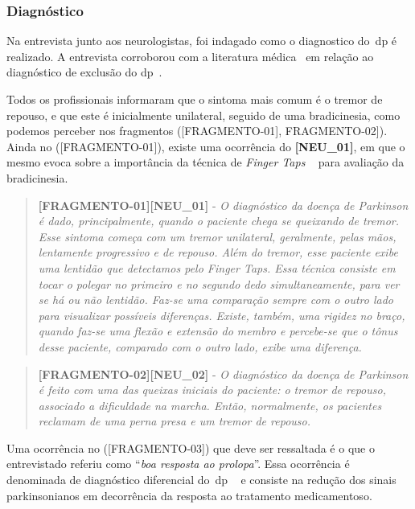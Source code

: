 \subsubsection{Diagnóstico}\label{section:analise_diagnostico}

Na entrevista junto aos neurologistas, foi indagado como o diagnostico do~\ac{dp} é realizado.  A entrevista corroborou com a literatura médica~\cite{tolosa06,vedolin2003} em relação ao diagnóstico de exclusão do \ac{dp}~\cite{protpar010,national2006parkinson}.  

Todos os profissionais informaram que o sintoma mais comum é o tremor de repouso, e que este é inicialmente unilateral, seguido de uma bradicinesia, como podemos perceber nos fragmentos ([FRAGMENTO-01], FRAGMENTO-02]). Ainda no ([FRAGMENTO-01]), existe uma ocorrência do \textbf{[NEU\_01]}, em que o mesmo evoca sobre a importância da técnica de \textit{Finger Taps} ~\cite{updrs87} para avaliação da bradicinesia.




\begin{quote}
\textbf{[FRAGMENTO-01][NEU\_01]} - 
\emph{
O diagnóstico da doença de Parkinson é dado, principalmente, quando o paciente chega se queixando de tremor. Esse sintoma começa com um tremor unilateral, geralmente, pelas mãos, lentamente progressivo e de repouso. Além do tremor, esse paciente exibe uma lentidão que detectamos pelo \textit{Finger Taps}. Essa técnica consiste em tocar o polegar no primeiro e no segundo dedo simultaneamente, para ver se há ou não lentidão. Faz-se uma comparação sempre com o outro lado para visualizar possíveis diferenças. Existe, também, uma rigidez no braço, quando faz-se uma flexão e extensão do membro e percebe-se que o tônus desse paciente, comparado com o outro lado, exibe uma diferença.
}
\end{quote}

\begin{quote}
\textbf{[FRAGMENTO-02][NEU\_02]} -
\emph{
O diagnóstico da doença de Parkinson é feito com uma das queixas iniciais do paciente: o tremor de repouso, associado  a dificuldade na marcha. Então, normalmente, os pacientes reclamam de uma perna presa e um tremor de repouso. 
}
\end{quote}

Uma ocorrência no ([FRAGMENTO-03]) que deve ser ressaltada é o que o entrevistado referiu como ``\textit{boa resposta ao prolopa}''. Essa ocorrência é denominada de diagnóstico diferencial do~\ac{dp} ~\cite{protpar010} e consiste na redução dos sinais parkinsonianos em decorrência da resposta ao tratamento medicamentoso. 

